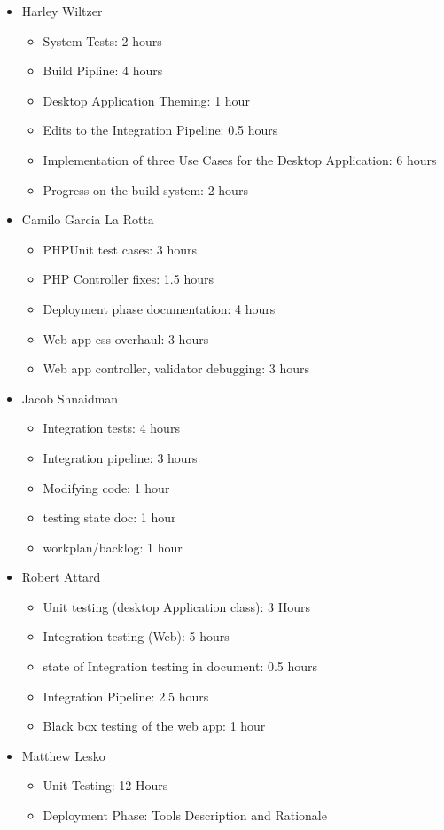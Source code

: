 \documentclass[12pt]{article}
\begin{document}
 \begin{itemize}
     \item Harley Wiltzer
        \begin{itemize}
            \item System Tests: 2 hours
            \item Build Pipline: 4 hours
            \item Desktop Application Theming: 1 hour
            \item Edits to the Integration Pipeline: 0.5 hours
            \item Implementation of three Use Cases for the Desktop Application: 6 hours
            \item Progress on the build system: 2 hours
        \end{itemize}
     \item Camilo Garcia La Rotta
     \begin{itemize}
         \item PHPUnit test cases: 3 hours
         \item PHP Controller fixes: 1.5 hours
         \item Deployment phase documentation: 4 hours
         \item Web app css overhaul: 3 hours
         \item Web app controller, validator debugging: 3 hours
     \end{itemize}
     \item Jacob Shnaidman
     \begin{itemize}
         \item Integration tests: 4 hours
         \item Integration pipeline: 3 hours
         \item Modifying code: 1 hour
         \item testing state doc: 1 hour
         \item workplan/backlog: 1 hour
     \end{itemize}
     \item Robert Attard
     \begin{itemize}
         \item Unit testing (desktop Application class): 3 Hours
         \item Integration testing (Web): 5 hours
         \item state of Integration testing in document: 0.5 hours
         \item Integration Pipeline: 2.5 hours 
         \item Black box testing of the web app: 1 hour
     \end{itemize}
     \item Matthew Lesko
     \begin{itemize}
        \item Unit Testing: 12 Hours
        \item Deployment Phase: Tools Description and Rationale
     \end{itemize}
 \end{itemize}
\end{document}
